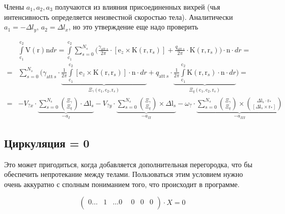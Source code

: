 \documentclass[14pt]{extreport}
\newcommand{\br}[1]{\boldsymbol{\mathrm{#1}}}
\renewcommand{\vec}[1]{\br{#1}}
\newcommand{\att}{\text{att}}
\begin{document}
Члены $a_1, a_2, a_3$ получаются из влияния присоединенных вихрей (чья интенсивность определяется неизвестной скоростью тела). Аналитически $a_1 = - \Delta l_y$, $a_2 = \Delta l_x$, но это утверждение еще надо проверить

\begin{equation}
\begin{split}
&\int\limits_{\vec c_1}^{\vec c_2} {\vec V(\vec r)\vec n dr}
= \int\limits_{\vec c_1}^{\vec c_2} {
	\sum\limits_{s=0}^{N_s} {
		\biggl (
		\frac{\gamma_{\att~s}}{2\pi} \cdot [\vec e_z \times \vec K(\vec r, \vec r_s)] +
		\frac{q_{\att~s}}{2\pi} \cdot \vec K(\vec r, \vec r_s)
		\biggr )
	}
	\cdot \vec n \cdot  dr
} = \\ =
&\sum\limits_{s=0}^{N_s} {
	\biggl (
	\gamma_{\att~s} \cdot 
	\underbrace{
	\frac{1}{2\pi}
	\int\limits_{\vec c_1}^{\vec c_2} {
		[\vec e_z \times \vec K(\vec r, \vec r_s)] \cdot \vec n \cdot dr
	}}_{\Xi_\gamma(\vec c_1, \vec c_2, \vec r_s)} + 
	q_{\att~s} \cdot
	\underbrace{
	\frac{1}{2\pi}
	\int\limits_{\vec c_1}^{\vec c_2} {
		\vec K(\vec r, \vec r_s) \cdot \vec n \cdot dr
	}}_{\Xi_q(\vec c_1, \vec c_2, \vec r_s)}
	\biggr )
} = \\ =
&-V_{?x} \cdot \underbrace{
	\sum\limits_{s=0}^{N_s} {\binom{\Xi_\gamma}{\Xi_q} \cdot \Delta \vec l_s}
}_{-a_I}
-V_{?y} \cdot \underbrace{
	\sum\limits_{s=0}^{N_s} {\binom{\Xi_\gamma}{\Xi_q} \times \Delta \vec l_s}
}_{-a_{II}}
-\omega_? \cdot \underbrace{
	\sum\limits_{s=0}^{N_s} {\binom{\Xi_\gamma}{\Xi_q} \times \binom{\Delta \vec l_s \cdot \vec r_*}{[\Delta \vec l_s \times \vec r_*]}}
}_{-a_{III}}
\end{split}
\end{equation}

\subsection{Циркуляция = 0}

Это может пригодиться, когда добавляется дополнительная перегородка, что бы обеспечить непротекание между телами.
Пользоваться этим условием нужно очень аккуратно с сполным пониманием того, что происходит в программе.

\begin{equation*}
\left(\begin{matrix}
0\dotsc& 1& \dotsc 0& ~~0& 0& 0\\
\end{matrix}\right)
\cdot X = 0
\end{equation*}
\end{document}
